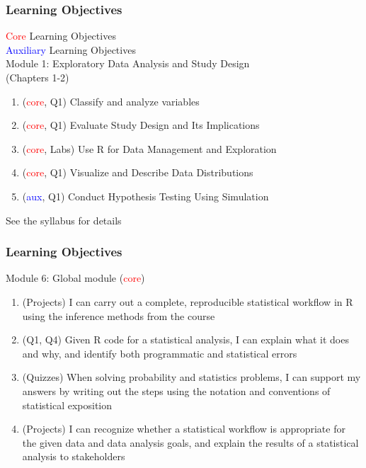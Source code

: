 \documentclass[slidestop,compress,mathserif]{beamer}
\begin{document}

\begin{frame}
	\frametitle{Learning Objectives}

	\textcolor{red}{Core} Learning Objectives \\
	\textcolor{blue}{Auxiliary} Learning Objectives \\

	\vspace{10pt}
	Module 1: Exploratory Data Analysis and Study Design \\(Chapters 1-2)
	\begin{enumerate}
		\item (\textcolor{red}{core}, Q1) Classify and analyze variables 
		\item (\textcolor{red}{core}, Q1) Evaluate Study Design and Its Implications 
		\item (\textcolor{red}{core}, Labs) Use R for Data Management and Exploration
		\item (\textcolor{red}{core}, Q1) Visualize and Describe Data Distributions 
		\item (\textcolor{blue}{aux}, Q1) Conduct Hypothesis Testing Using Simulation 
	\end{enumerate}
	See the syllabus for details
\end{frame}

\begin{frame}
	\frametitle{Learning Objectives}
	Module 6: Global module (\textcolor{red}{core})
	\begin{enumerate}
		\item (Projects) I can carry out a complete, reproducible statistical workflow in R using the inference methods from the course  
		\item (Q1, Q4) Given R code for a statistical analysis, I can explain what it does and why, and identify both programmatic and statistical errors 
		\item (Quizzes) When solving probability and statistics problems, I can support my answers by writing out the steps using the notation and conventions of statistical exposition  
		\item (Projects) I can recognize whether a statistical workflow is appropriate for the given data and data analysis goals, and explain the results of a statistical analysis to stakeholders
	\end{enumerate}
\end{frame}

\end{document}
